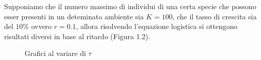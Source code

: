 \begin{exm}
 Supponiamo che il numero massimo di individui di una certa specie che possono esser presenti in un deteminato 
ambiente sia $K=100$, che il tasso di crescita sia del $10 \% $ ovvero $r=0.1$, allora risolvendo l'equazione 
logistica si ottengono risultati diversi in base al ritardo (Figura 1.2). 
\begin{figure}[!ht]
\centering
\caption{Grafici al variare di $\tau$}
\hspace{1mm}
\hspace{1mm}
\hspace{1mm}

\end{figure}
\end{exm}
